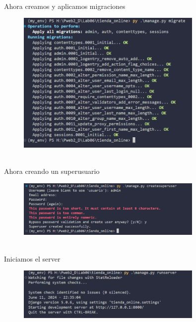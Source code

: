 \documentclass{article}
\begin{document}
\\Ahora creamos y aplicamos migraciones

     \begin{figure}[H]
		          \centering
		          \includegraphics[width=0.8\textwidth,keepaspectratio]                       {img/migration.png}
    \end{figure}


\\Ahora creando un superusuario

     \begin{figure}[H]
		          \centering
		          \includegraphics[width=0.8\textwidth,keepaspectratio]                       {img/admin.png}
    \end{figure}

\\Iniciamos el server

    \begin{figure}[H]
		          \centering
		          \includegraphics[width=0.8\textwidth,keepaspectratio]                       {img/runserver.png}
    \end{figure}
    
\end{document}

